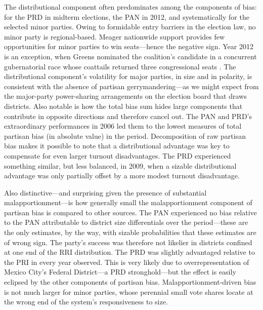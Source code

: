 \documentclass[letter,12pt]{article}
\begin{document}
The distributional component often predominates among the components of bias: for the PRD in midterm elections, the PAN in 2012, and systematically for the selected minor parties. Owing to formidable entry barriers in the election law, no minor party is regional-based. Meager nationwide support provides few opportunities for minor parties to win seats---hence the negative sign. Year 2012 is an exception, when Greens nominated the coalition's candidate in a concurrent gubernatorial race whose coattails returned three congressional seats \citep{magar.gubCoatMx.2012}. The distributional component's volatility for major parties, in size and in polarity, is consistent with the absence of partisan gerrymandering---as we might expect from the major-party power-sharing arrangements on the election board that draws districts. Also notable is how the total bias sum hides large components that contribute in opposite directions and therefore cancel out. The PAN and PRD's extraordinary performances in 2006 led them to the lowest measures of total partisan bias (in absolute value) in the period. Decomposition of raw partisan bias makes it possible to note that a distributional advantage was key to compensate for even larger turnout disadvantages. The PRD experienced something similar, but less balanced, in 2009, when a sizable distributional advantage was only partially offset by a more modest turnout disadvantage. 

Also distinctive---and surprising given the presence of substantial malapportionment---is how generally small the malapportionment component of partisan bias is compared to other sources. The PAN experienced no bias relative to the PAN attributable to district size differentials over the period---these are the only estimates, by the way, with sizable probabilities that these estimates are of wrong sign. The party's success was therefore not likelier in districts confined at one end of the RRI distribution. The PRD was slightly advantaged relative to the PRI in every year observed. This is very likely due to overrepresentation of Mexico City's Federal District---a PRD stronghold---but the effect is easily eclipsed by the other components of partisan bias. \citep[The drop from +.14 to +.05 between 2003 and 2006 actually coincides with reapportionment and the accessory reduction---not removal---of the capital's overrepresentation in Congress, see][.]{altman.magar.mcd.trelles2014apsa} Malapportionment-driven bias is not much larger for minor parties, whose perennial small vote shares locate at the wrong end of the system's responsiveness to size. 
\end{document}
